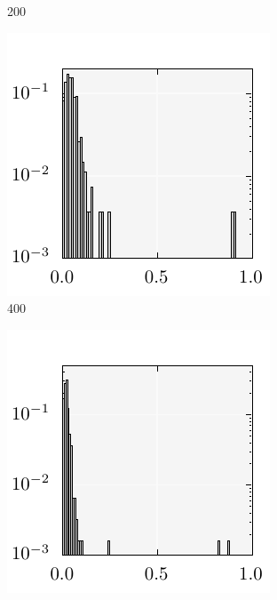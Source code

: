 \documentclass{stdlocal}
\begin{document}
\begin{figure}[t]
\begin{subfigure}[b]{0.24\textwidth}
        \caption{200}
      \end{subfigure}
      \begin{subfigure}[b]{0.24\textwidth}
        \center
        \includegraphics[width=\textwidth]{../../plots/kursawe_histogram_400.pdf}
        \caption{400}
      \end{subfigure}
      \begin{subfigure}[b]{0.24\textwidth}
        \center
        \includegraphics[width=\textwidth]{../../plots/kursawe_histogram_1000.pdf}

\end{subfigure}
\end{figure}
\end{document}
